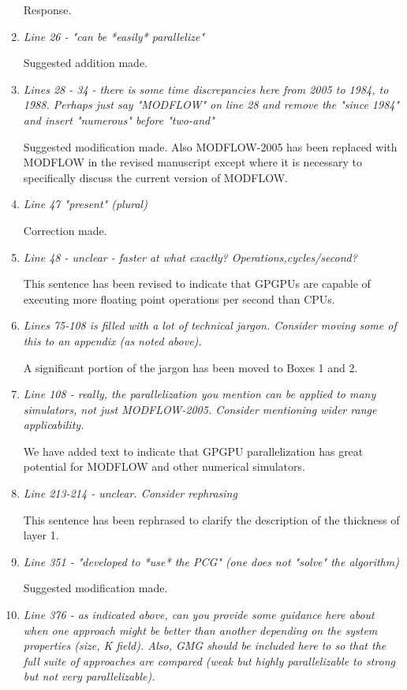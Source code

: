 \documentclass[12pt]{article} %
\begin{document}
\begin{enumerate}
Response. 

\item \textit{Line 26 - "can be *easily* parallelize"} 

Suggested addition made. 

\item \textit{Lines 28 - 34 - there is some time discrepancies here from 2005 to 1984, to 1988. Perhaps just say "MODFLOW" on line 28 and remove the "since 1984" and insert "numerous" before "two-and" } 

Suggested modification made. Also MODFLOW-2005 has been replaced with MODFLOW in the revised manuscript except where it is necessary to specifically discuss the current version of MODFLOW.

\item \textit{Line 47 "present" (plural)} 

Correction made. 

\item \textit{Line 48 - unclear - faster at what exactly? Operations,cycles/second? } 

This sentence has been revised to indicate that GPGPUs are capable of executing more floating point operations per second than CPUs.

\item \textit{Lines 75-108 is filled with a lot of technical jargon. Consider moving some of this to an appendix (as noted above). } 

A significant portion of the jargon has been moved to Boxes 1 and 2.

\item \textit{Line 108 - really, the parallelization you mention can be applied to many simulators, not just MODFLOW-2005. Consider mentioning wider range applicability. } 

We have added text to indicate that GPGPU parallelization has great potential for MODFLOW and other numerical simulators.

\item \textit{Line 213-214 - unclear. Consider rephrasing } 

This sentence has been rephrased to clarify the description of the thickness of layer 1.

\item \textit{Line 351 - "developed to *use* the PCG" (one does not "solve" the algorithm) } 

Suggested modification made.

\item \textit{Line 376 - as indicated above, can you provide some guidance here about when one approach might be better than another depending on the system properties (size, K field). Also, GMG should be included here to so that the full suite of approaches are compared (weak but highly parallelizable to strong but not very parallelizable). } 


\end{enumerate}
\end{document}

